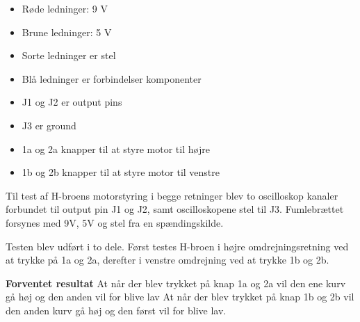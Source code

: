 \begin{itemize}
	\item 	Røde ledninger: 9 V
	\item	Brune ledninger: 5 V
	\item	Sorte ledninger er stel
	\item	Blå ledninger er forbindelser komponenter
	\item	J1 og J2 er output pins 
	\item	J3 er ground
	\item	1a og 2a knapper til at styre motor til højre
	\item	1b og 2b knapper til at styre motor til venstre 	
\end{itemize}

\noindent Til test af H-broens motorstyring i begge retninger blev to oscilloskop kanaler forbundet til output pin J1 og J2, samt oscilloskopene stel til J3. Fumlebrættet forsynes med 9V, 5V og stel fra en spændingskilde. 

\noindent Testen blev udført i to dele. Først testes H-broen i højre omdrejningsretning ved at trykke på 1a og 2a, derefter i venstre omdrejning ved at trykke 1b og 2b. \newline

\noindent \textbf{Forventet resultat} \newline
At når der blev trykket på knap 1a og 2a vil den ene kurv gå høj og den anden vil for blive lav
At når der blev trykket på knap 1b og 2b vil den anden kurv gå høj og den først vil for blive lav.
\\
\\


